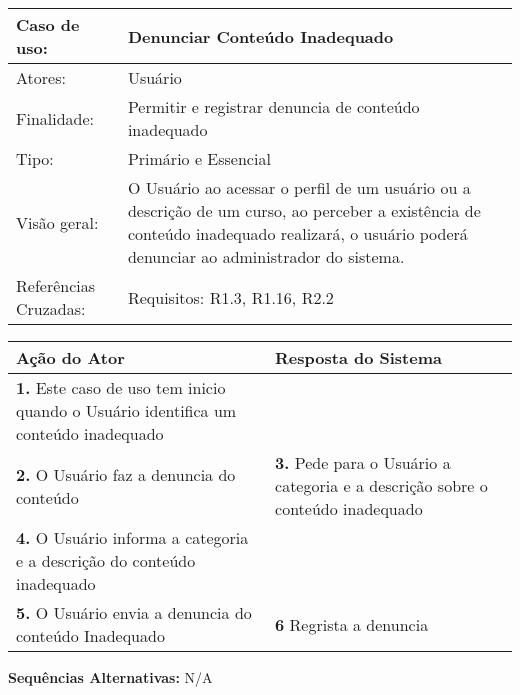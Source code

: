 \documentclass[12pt,a4paper,onecolumn,titlepage]{article}
\begin{document}
\begin{table}[h!]
\begin{center}
\begin{tabular}{p{2.5cm} p{9.5cm}}
Caso de uso: & \textbf{Denunciar Conteúdo Inadequado} \\ \hline
Atores: & Usuário \\ \hline
Finalidade: & Permitir e registrar denuncia de conteúdo inadequado\\ \hline
Tipo: & Primário e Essencial \\ \hline
Visão geral: & O Usuário ao acessar o perfil de um usuário ou a descrição de um curso, ao perceber a existência de conteúdo inadequado realizará, o usuário poderá denunciar ao administrador do sistema. \\ \hline
Referências Cruzadas: & Requisitos: R1.3, R1.16, R2.2\\

\end{tabular}
\end{center}
\end{table} 


\begin{center}
\def\arraystretch{1.1}
\begin{tabular}{|p{6cm}|p{6cm}|}

\hline
\textbf{Ação do Ator} & \textbf{Resposta do Sistema} \\ \hline
\textbf{1.} Este caso de uso tem inicio quando o Usuário identifica um conteúdo inadequado & \\ \hline
\textbf{2.} O Usuário faz a denuncia do conteúdo  & \textbf{3.} Pede para o Usuário a categoria e a descrição sobre o conteúdo inadequado  \\ \hline
\textbf{4.} O Usuário informa a categoria e a descrição do conteúdo inadequado & \\ \hline
\textbf{5.} O Usuário envia a denuncia do conteúdo Inadequado & \textbf{6} Regrista a denuncia \\ \hline
\end{tabular}
\end{center}

\textbf{Sequências Alternativas:} N/A

\newpage
\end{document}
